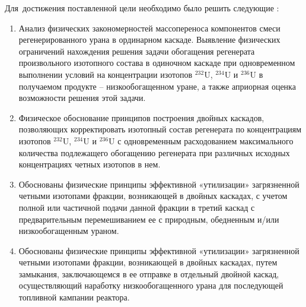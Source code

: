 Для~достижения поставленной цели необходимо было решить следующие {\tasks}:
\begin{enumerate}
  \item Анализ физических закономерностей массопереноса компонентов смеси
  регенерированного урана в ординарном каскаде.
  Выявление физических ограничений нахождения решения задачи обогащения регенерата произвольного изотопного
  состава в одиночном каскаде при одновременном выполнении условий на
  концентрации изотопов $^{232}$U, $^{234}$U и $^{236}$U в получаемом продукте – низкообогащенном уране, а также априорная оценка возможности решения этой задачи.
  \item Физическое обоснование принципов построения двойных каскадов,
  позволяющих корректировать изотопный состав регенерата по концентрациям
  изотопов $^{232}$U, $^{234}$U и $^{236}$U с одновременным расходованием максимального количества
  подлежащего обогащению регенерата при различных исходных концентрациях
  четных изотопов в нем.
  \item Обоснованы физические принципы эффективной «утилизации» загрязненной четными
  изотопами фракции, возникающей в двойных каскадах, с учетом полной или
  частичной подачи данной фракции в третий каскад с предварительным
  перемешиванием ее с природным, обедненным и/или низкообогащенным ураном.
  \item Обоснованы физические принципы эффективной «утилизации» загрязненной четными
  изотопами фракции, возникающей в двойных каскадах, путем замыкания, заключающемся в ее отправке в отдельный двойной каскад, осуществляющий наработку низкообогащенного урана для последующей топливной кампании реактора.
\end{enumerate}


